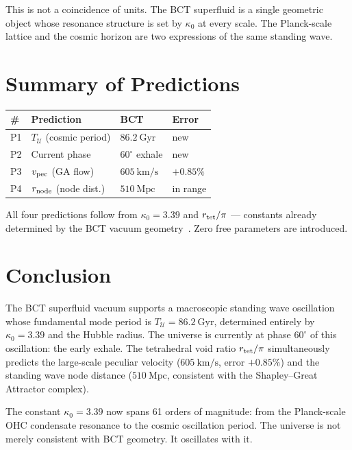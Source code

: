 \documentclass[aps,prl,twocolumn,showpacs,superscriptaddress]{revtex4-2}
\begin{document}
This is not a coincidence of units. The BCT superfluid is a single geometric 
object whose resonance structure is set by $\kappa_0$ at every scale. The 
Planck-scale lattice and the cosmic horizon are two expressions of the same 
standing wave.

\section{Summary of Predictions}

\begin{center}
\begin{tabular}{llll}
\toprule
\# & Prediction & BCT & Error \\
\midrule
P1 & $T_{\mathcal{U}}$ (cosmic period) & $86.2~\text{Gyr}$ & new \\
P2 & Current phase & $60^\circ$ exhale & new \\
P3 & $v_{\rm pec}$ (GA flow) & $605~\text{km/s}$ & $+0.85\%$ \\
P4 & $r_{\rm node}$ (node dist.) & $510~\text{Mpc}$ & in range \\
\bottomrule
\end{tabular}
\end{center}

All four predictions follow from $\kappa_0 = 3.39$ and $r_{\rm tet}/\pi$ --- 
constants already determined by the BCT vacuum geometry~\cite{L1}. Zero free 
parameters are introduced.

\section{Conclusion}

The BCT superfluid vacuum supports a macroscopic standing wave oscillation 
whose fundamental mode period is $T_{\mathcal{U}} = 86.2~\text{Gyr}$, 
determined entirely by $\kappa_0 = 3.39$ and the Hubble radius. The universe 
is currently at phase $60^\circ$ of this oscillation: the early exhale. The 
tetrahedral void ratio $r_{\rm tet}/\pi$ simultaneously predicts the 
large-scale peculiar velocity ($605~\text{km/s}$, error $+0.85\%$) and the 
standing wave node distance ($510~\text{Mpc}$, consistent with the 
Shapley--Great Attractor complex).

The constant $\kappa_0 = 3.39$ now spans 61 orders of magnitude: from the 
Planck-scale OHC condensate resonance to the cosmic oscillation period. The 
universe is not merely consistent with BCT geometry. It oscillates with it.
\end{document}

